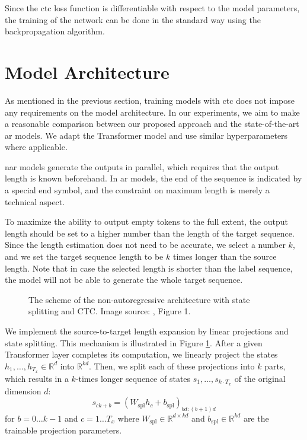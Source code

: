 Since the \ac{ctc} loss function is differentiable with respect to the model
parameters, the training of the network can be done in the standard way using
the backpropagation algorithm.

\section{Model Architecture}
\label{sec:ctc:arch}

As mentioned in the previous section, training models with \ac{ctc} does not
impose any requirements on the model architecture. In our experiments, we aim
to make a reasonable comparison between our proposed approach and the
state-of-the-art \acl{ar} models. We adapt the Transformer model and use
similar hyperparameters where applicable.

\Acl{nar} models generate the outputs in parallel, which requires that the
output length is known beforehand. In \acl{ar} models, the end of the sequence
is indicated by a special end symbol, and the constraint on maximum length is
merely a technical aspect.

To maximize the ability to output empty tokens to the full extent, the output
length should be set to a higher number than the length of the target sequence.
Since the length estimation does not need to be accurate, we select a number
$k$, and we set the target sequence length to be $k$ times longer than the
source length. Note that in case the selected length is shorter than the label
sequence, the model will not be able to generate the whole target sequence.

\begin{figure}
  \centering
  

  \caption{The scheme of the non-autoregressive architecture with
    state splitting and CTC. Image source: \citet{libovicky-helcl-2018-end},
    Figure 1.}%
  \label{fig:state-splitting}
\end{figure}


We implement the source-to-target length expansion by linear projections and
state splitting. This mechanism is illustrated in Figure
\ref{fig:state-splitting}. After a given Transformer layer completes its
computation, we linearly project the states
$h_1, \ldots, h_{T_x} \in \mathbb{R}^d$ into $\mathbb{R}^{kd}$. Then, we split
each of these projections into $k$ parts, which results in a $k$-times longer
sequence of states $s_1, \ldots, s_{k \cdot T_x}$ of the original dimension
$d$:
%
\begin{equation}
  s_{ck+b} = \left( W_{\text{spl}} h_c + b_{\text{spl}} \right)_{bd:(b+1)d}
\end{equation}
%
for $b=0 \ldots k-1$ and $c=1 \ldots T_x$ where
$W_{\text{spl}} \in \mathbb{R}^{d \times kd}$ and
$b_{\text{spl}} \in \mathbb{R}^{kd}$ are the trainable projection parameters.

